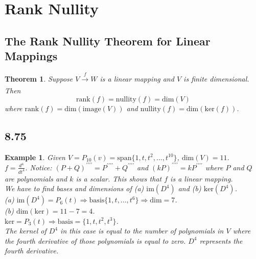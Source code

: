 \documentclass{report}
\newtheorem*{ex}{Example}
\newtheorem*{thrm}{Theorem}
\begin{document}
\section{Rank Nullity}
\subsection{The Rank Nullity Theorem for Linear Mappings}
\begin{thrm}
Suppose $V \xrightarrow[]{f} W$ is a linear mapping and $V$ is finite dimensional. Then
\[ \mathrm{rank}(f) = \mathrm{nullity}(f) = \mathrm{dim}(V) \]
where $\mathrm{rank}(f) = \mathrm{dim}(\mathrm{image}(V))$ and $\mathrm{nullity}(f)=\mathrm{dim}(\mathrm{ker}(f))$.
\end{thrm}
\subsection{8.75}
\begin{ex}
Given $V=P_{10}(v) = \mathrm{span}\{1,t,t^2,...,t^{10}\}$, $\mathrm{dim}(V)=11$.\\
$f=\frac{d^4}{dt^4}$. Notice: $(P+Q)^{\prime\prime\prime\prime} = P^{\prime\prime\prime\prime} + Q^{\prime\prime\prime\prime}$ and $(kP)^{\prime\prime\prime\prime} = kP^{\prime\prime\prime\prime}$ where $P$ and $Q$ are polynomials and $k$ is a scalar. This shows that $f$ is a linear mapping.\\
We have to find bases and dimensions of (a) $\mathrm{im}(D^4)$ and (b) $\mathrm{ker}(D^4)$.\\
(a) $\mathrm{im}(D^4)=P_6(t) \Rightarrow \mathrm{basis}\{1,t,...,t^6\} \Rightarrow \mathrm{dim} = 7$.\\
(b) $\mathrm{dim}(\mathrm{ker}) = 11-7=4$.\\
$\mathrm{ker} = P_3(t) \Rightarrow \mathrm{basis}=\{1,t,t^2,t^3\}$.\\
The kernel of $D^4$ in this case is equal to the number of polynomials in $V$ where the fourth derivative of those polynomials is equal to zero. $D^4$ represents the fourth derivative.
\end{ex}
\end{document}
